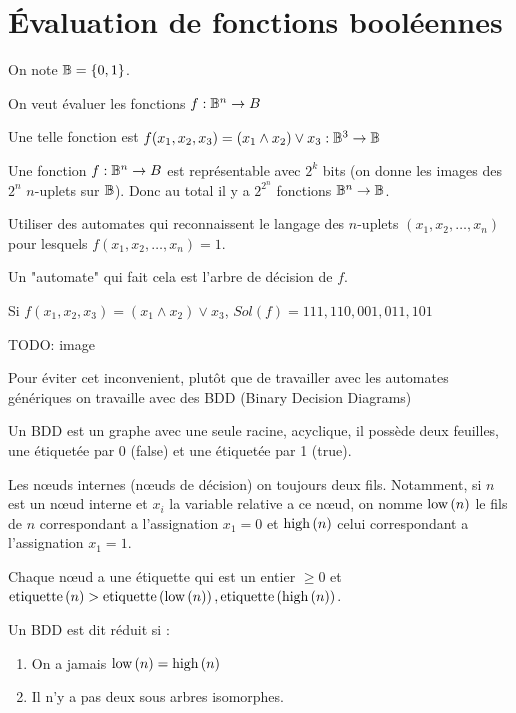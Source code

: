 \section{Évaluation de fonctions booléennes}

\begin{notation}
	On note $\mathbb{B} = \left\{0,1\right\}$.
\end{notation}

On veut évaluer les fonctions $f : \mathbb{B} ^ n \to B$

\begin{exemple}
	Une telle fonction est $f(x_1,x_2,x_3) = (x_1 \land x_2) \lor x_3 : \mathbb{B}^3 \to \mathbb{B}$
\end{exemple}

Une fonction $f : \mathbb{B} ^ n \to B$ est représentable avec $2^k$ bits
(on donne les images des $2^n$ $n$-uplets sur $\mathbb{B}$).
Donc au total il y a $2^{2^n}$ fonctions $\mathbb{B}^n \to \mathbb{B}$.

\begin{idee}
	Utiliser des automates qui reconnaissent le langage des $n$-uplets
	$(x_1,x_2,\ldots, x_n)$ pour lesquels $f(x_1, x_2, \ldots, x_n) = 1$.
\end{idee}

Un "automate" qui fait cela est l'arbre de décision de $f$.

\begin{exemple}
	Si $f(x_1,x_2,x_3) = (x_1 \land x_2) \lor x_3$, $Sol(f) = 111,110,001,011,101$

	TODO: image
\end{exemple}


Pour éviter cet inconvenient, plutôt que de travailler avec les automates génériques
on travaille avec des BDD (Binary Decision Diagrams)

\begin{definition}
	Un BDD est un graphe avec une seule racine, acyclique, il possède deux feuilles,
	une étiquetée par 0 (false) et une étiquetée par 1 (true).

	Les nœuds internes (nœuds de décision) on toujours deux fils. Notamment, si $n$ est un nœud interne
	et $x_i$ la variable relative a ce nœud, on nomme $\text{low}\left(n\right)$ le fils de $n$ correspondant a l'assignation
	$x_1 = 0$ et $\text{high}\left(n\right)$ celui correspondant a l'assignation $x_1 = 1$.

	Chaque nœud a une étiquette qui est un entier $\geq 0$ et $\text{etiquette}\left(n\right) > \text{etiquette}\left(\text{low}\left(n\right)\right),  \text{etiquette}\left(\text{high}\left(n\right)\right)$.
\end{definition}


\begin{definition}
	Un BDD est dit réduit si :
	\begin{enumerate}
		\item On a jamais $\text{low}\left(n\right) = \text{high}\left(n\right)$
		\item Il n'y a pas deux sous arbres isomorphes.
	\end{enumerate}
\end{definition}

